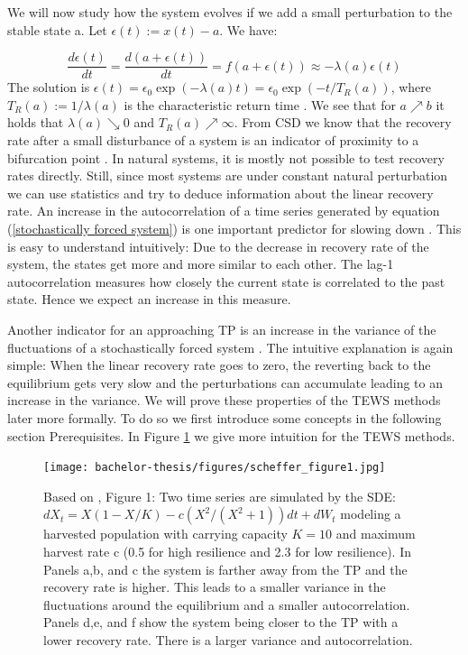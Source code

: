 \documentclass[%
thesis=student,%
coverpage=false,%
titlepage=false,%
headmarks=true, %
english,%
font=libertine, %
math=newpxtx, %
BCOR=5mm,%
coverBCOR=11mm%
]{tumbook}
\begin{document}
We will now study how the system evolves if we add a small perturbation to the stable state a. Let $\epsilon(t):= x(t) - a$. We have:

\[
\frac{d\epsilon(t)}{dt} = \frac{d(a + \epsilon(t))}{dt} = f(a + \epsilon(t)) \approx 
 -\lambda(a)\epsilon(t)
\]
The solution is $\epsilon(t) = \epsilon_{0}\exp(-\lambda(a)t) = \epsilon_{0}\exp(-t/T_{R}(a))$, where $T_{R}(a) := 1/ \lambda(a)$ is the characteristic return time \cite{Wissel:1984}.
We see that for $a \nearrow b$ it holds that $\lambda(a) \searrow 0$ and $T_{R}(a)\nearrow \infty$. 
From CSD we know that the recovery rate after a small disturbance of a system is an indicator of proximity to a bifurcation point \cite{VanNes:2007}. In natural systems, it is mostly not possible to test recovery rates directly. Still, since most systems are under constant natural perturbation we can use statistics and try to deduce information about the linear recovery rate. An increase in the autocorrelation of a time series generated by equation (\ref{stochastically forced system}) is one important predictor for slowing down \cite{Ives:1995}. This is easy to understand intuitively: Due to the decrease in recovery rate of the system, the states get more and more similar to each other. The lag-1 autocorrelation measures how closely the current state is correlated to the past state. Hence we expect an increase in this measure.

Another indicator for an approaching TP is an increase in the variance of the fluctuations of a stochastically forced system \cite{Carpenter:2006}. The intuitive explanation is again simple: When the linear recovery rate goes to zero, the reverting back to the equilibrium gets very slow and the perturbations can accumulate leading to an increase in the variance. 
We will prove these properties of the TEWS methods later more formally. To do so we first introduce some concepts in the following section Prerequisites. In Figure \ref{fig:scheffer_fig_1_reimp} we give more intuition for the TEWS methods. \\



\begin{figure}[h]
    \centering
    \texttt{[image: bachelor-thesis/figures/scheffer\_figure1.jpg]}
    \caption{Based on \cite{Scheffer:2009}, Figure 1:
    Two time series are simulated by the SDE: $dX_{t}=X(1-X/K)-c(X^2/(X^2+1))dt + dW_{t}$ modeling a harvested population with carrying capacity $K = 10$ and maximum harvest rate c (0.5 for high resilience and 2.3 for low resilience). In Panels a,b, and c the system is farther away from the TP and the recovery rate is higher. This leads to a smaller variance in the fluctuations around the equilibrium and a smaller autocorrelation. Panels d,e, and f show the system being closer to the TP with a lower recovery rate. There is a larger variance and autocorrelation.}
    \label{fig:scheffer_fig_1_reimp}
\end{figure}
\end{document}
